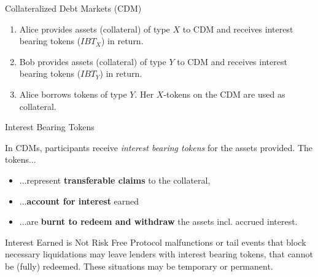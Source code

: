 \documentclass[handout]{beamer}
\begin{document}
\begin{frame}{Collateralized Debt Markets (CDM)}


\vspace{-1em}

\begin{figure}[t]
	\centering
	\begin{tikzpicture}[scale=1.0, every node/.style={scale=1.0}]
		
	\end{tikzpicture}
\end{figure}

\vspace{-1em}

\small

\begin{enumerate}
	\item<2-> {Alice provides assets (collateral) of type $X$ to CDM and receives interest bearing tokens ($IBT_X$) in return.}
	\item<3-> {Bob provides assets (collateral) of type $Y$ to CDM and receives interest bearing tokens ($IBT_Y$) in return.}
	\item<4-> {Alice borrows tokens of type $Y$. Her $X$-tokens on the CDM are used as collateral.}
\end{enumerate}

	
\end{frame}


\begin{frame}{Interest Bearing Tokens}

In CDMs, participants receive \emph{interest bearing tokens} for the assets provided. The tokens...
\vspace{0.5em}
\begin{itemize}
  \item ...represent \textbf{transferable claims} to the collateral,
  \item ...\textbf{account for interest} earned
  \item ...are \textbf{burnt to redeem and withdraw} the assets incl. accrued interest.
\end{itemize}

 {
\vspace{1.0em}
\begin{keytakeaway}{Interest Earned is Not Risk Free}
	Protocol malfunctions or tail events that block necessary liquidations may leave lenders with interest bearing tokens, that cannot be (fully) redeemed. These situations may be temporary or permanent.
\end{keytakeaway}
}

\end{frame}
\end{document}
